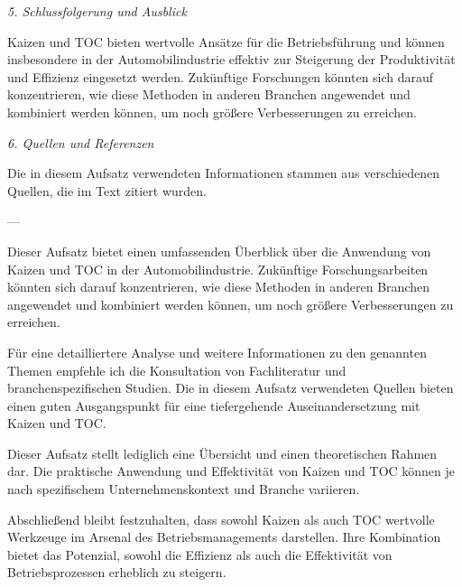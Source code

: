 \textit{5. Schlussfolgerung und Ausblick}

Kaizen und TOC bieten wertvolle Ansätze für die Betriebsführung und können insbesondere in der Automobilindustrie effektiv zur Steigerung der Produktivität und Effizienz eingesetzt werden. Zukünftige Forschungen könnten sich darauf konzentrieren, wie diese Methoden in anderen Branchen angewendet und kombiniert werden können, um noch größere Verbesserungen zu erreichen.

\textit{6. Quellen und Referenzen}

Die in diesem Aufsatz verwendeten Informationen stammen aus verschiedenen Quellen, die im Text zitiert wurden. 

---

Dieser Aufsatz bietet einen umfassenden Überblick über die Anwendung von Kaizen und TOC in der Automobilindustrie. Zukünftige Forschungsarbeiten könnten sich darauf konzentrieren, wie diese Methoden in anderen Branchen angewendet und kombiniert werden können, um noch größere Verbesserungen zu erreichen.

Für eine detailliertere Analyse und weitere Informationen zu den genannten Themen empfehle ich die Konsultation von Fachliteratur und branchenspezifischen Studien. Die in diesem Aufsatz verwendeten Quellen bieten einen guten Ausgangspunkt für eine tiefergehende Auseinandersetzung mit Kaizen und TOC.

Dieser Aufsatz stellt lediglich eine Übersicht und einen theoretischen Rahmen dar. Die praktische Anwendung und Effektivität von Kaizen und TOC können je nach spezifischem Unternehmenskontext und Branche variieren. 

Abschließend bleibt festzuhalten, dass sowohl Kaizen als auch TOC wertvolle Werkzeuge im Arsenal des Betriebsmanagements darstellen. Ihre Kombination bietet das Potenzial, sowohl die Effizienz als auch die Effektivität von Betriebsprozessen erheblich zu steigern.